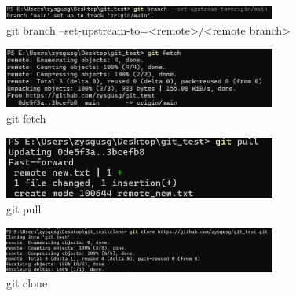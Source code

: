\documentclass[UTF8]{ctexart}
\begin{document}
\begin{figure}[htbp]
    \centering
    \includegraphics[width=0.8\textwidth]{16.png} 
    \caption{git branch --set-upstream-to=<remote>/<remote branch>}
\end{figure}
\begin{figure}[htbp]
    \centering
    \includegraphics[width=0.8\textwidth]{17.png} 
    \caption{git fetch}
\end{figure}
\begin{figure}[htbp]
    \centering
    \includegraphics[width=0.8\textwidth]{18.png} 
    \caption{git pull}
\end{figure}
\begin{figure}[htbp]
    \centering
    \includegraphics[width=0.8\textwidth]{19.png} 
    \caption{git clone}
\end{figure}
\end{document}
